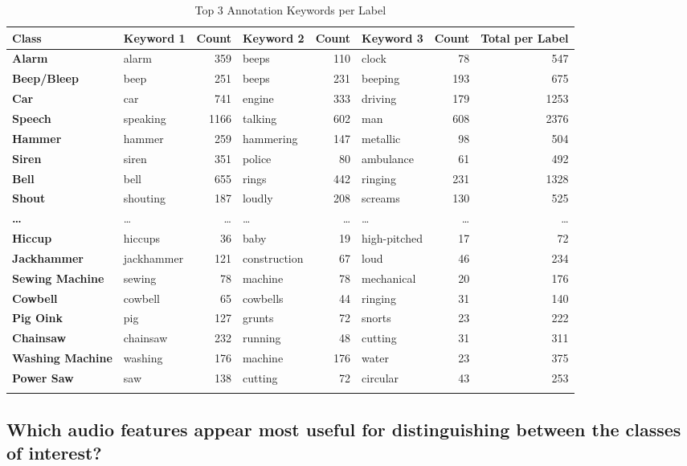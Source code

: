 \begin{table}[ht]
\centering
\caption{Top 3 Annotation Keywords per Label}
\label{tab:keyword_summary_dots_count}
\begin{tabular}{l l r l r l r r}
\toprule
\textbf{Class} & \textbf{Keyword 1} & \textbf{Count} & \textbf{Keyword 2} & \textbf{Count} & \textbf{Keyword 3} & \textbf{Count} & \textbf{Total per Label} \\
\midrule
\textbf{Alarm} & alarm & 359 & beeps & 110 & clock & 78 & 547 \\
\textbf{Beep/Bleep} & beep & 251 & beeps & 231 & beeping & 193 & 675 \\
\textbf{Car} & car & 741 & engine & 333 & driving & 179 & 1253 \\
\textbf{Speech} & speaking & 1166 & talking & 602 & man & 608 & 2376 \\
\textbf{Hammer} & hammer & 259 & hammering & 147 & metallic & 98 & 504 \\
\textbf{Siren} & siren & 351 & police & 80 & ambulance & 61 & 492 \\
\textbf{Bell} & bell & 655 & rings & 442 & ringing & 231 & 1328 \\
\textbf{Shout} & shouting & 187 & loudly & 208 & screams & 130 & 525 \\
\midrule
\textbf{\dots} & \dots & \dots & \dots & \dots & \dots & \dots & \dots \\
\midrule
\textbf{Hiccup} & hiccups & 36 & baby & 19 & high-pitched & 17 & 72 \\
\textbf{Jackhammer} & jackhammer & 121 & construction & 67 & loud & 46 & 234 \\
\textbf{Sewing Machine} & sewing & 78 & machine & 78 & mechanical & 20 & 176 \\
\textbf{Cowbell} & cowbell & 65 & cowbells & 44 & ringing & 31 & 140 \\
\textbf{Pig Oink} & pig & 127 & grunts & 72 & snorts & 23 & 222 \\
\textbf{Chainsaw} & chainsaw & 232 & running & 48 & cutting & 31 & 311 \\
\textbf{Washing Machine} & washing & 176 & machine & 176 & water & 23 & 375 \\
\textbf{Power Saw} & saw & 138 & cutting & 72 & circular & 43 & 253 \\
\bottomrule
\label{tbl:1}
\end{tabular}
\end{table}



\subsection{Which audio features appear most useful for distinguishing between the classes of interest? }
\label{sec:Labeling Function:b}

